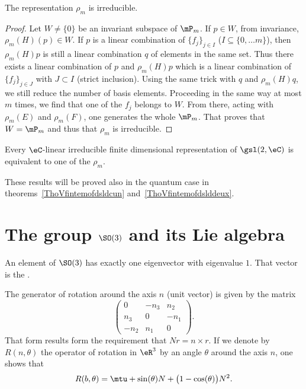 \begin{proposition}     \label{ProprhomirredsldeuxC}
The representation $\rho_m$ is irreducible.
\end{proposition}

\begin{proof}
Let $W\neq\{ 0 \}$ be an invariant subspace of $\mP_m$. If $p\in W$, from invariance, $\rho_m(H)(p)\in W$. If $p$ is a linear combination of $\{ f_j \}_{j\in I}$ ($I\subseteq \{ 0,\ldots m \}$), then $\rho_m(H)p$ is still a linear combination $q$ of elements in the same set. Thus there exists a linear combination of $p$ and $\rho_m(H)p$ which is a linear combination of $\{ f_j \}_{j\in J}$ with $J\subset I$ (strict inclusion). Using the same trick with $q$ and $\rho_m(H)q$, we still reduce the number of basis elements. Proceeding in the same way at most $m$ times, we find that one of the $f_j$ belongs to $W$. From there, acting with $\rho_m(E)$ and $\rho_m(F)$, one generates the whole $\mP_m$. That proves that $W=\mP_m$ and thus that $\rho_m$ is irreducible.
\end{proof}

\begin{theorem}
Every $\eC$-linear irreducible finite dimensional representation of $\gsl(2,\eC)$ is equivalent to one of the $\rho_m$.
\end{theorem}

These results will be proved also in the quantum case in theorems~\ref{ThoVfintemofdsldcun} and~\ref{ThoVfintemofdslddeux}.

                    \section{The group \texorpdfstring{$\SO(3)$}{SO3} and its Lie algebra}
\label{SubSecTheGroupSotrois}

\begin{proposition}
An element of $\SO(3)$ has exactly one eigenvector with eigenvalue $1$. That vector is the .
\end{proposition}

The generator of rotation around the axis $n$ (unit vector) is given by the matrix
\begin{equation}
\begin{pmatrix}
  0 &   -n_3    &   n_2\\
  n_3   &   0   &   -n_1\\
 -n_2   &   n_1 & 0
\end{pmatrix}.
\end{equation}
That form results form the requirement that $Nr=n\times r$. If we denote by $R(n,\theta)$ the operator of rotation in $\eR^3$ by an angle $\theta$ around the axis $n$, one shows that
\begin{equation}
    R(b,\theta)=\mtu+\sin(\theta) N+\big(1-\cos(\theta)\big)N^2.
\end{equation}


